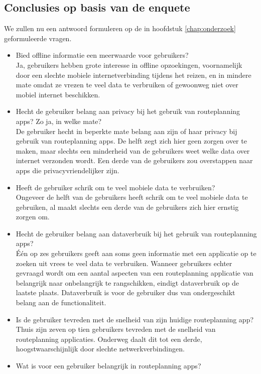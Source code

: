 \subsection{Conclusies op basis van de enquete}
We zullen nu een antwoord formuleren op de in hoofdstuk \ref{chap:onderzoek} geformuleerde vragen.
\begin{itemize}
	\item Bied offline informatie een meerwaarde voor gebruikers?\\
	Ja, gebruikers hebben grote interesse in offline opzoekingen, voornamelijk door een slechte mobiele internetverbinding tijdens het reizen, en in mindere mate omdat ze vrezen te veel data te verbruiken of gewoonweg niet over mobiel internet beschikken.
	\item Hecht de gebruiker belang aan privacy bij het gebruik van routeplanning apps? Zo ja, in welke mate?\\
	De gebruiker hecht in beperkte mate belang aan zijn of haar privacy bij gebruik van routeplanning apps. De helft zegt zich hier geen zorgen over te maken, maar slechts een minderheid van de gebruikers weet welke data over internet verzonden wordt. Een derde van de gebruikers zou overstappen naar apps die privacyvriendelijker zijn.
	\item Heeft de gebruiker schrik om te veel mobiele data te verbruiken?\\
	Ongeveer de helft van de gebruikers heeft schrik om te veel mobiele data te gebruiken, al maakt slechts een derde van de gebruikers zich hier ernstig zorgen om.
	\item Hecht de gebruiker belang aan dataverbruik bij het gebruik van routeplanning apps?\\
	Één op zes gebruikers geeft aan soms geen informatie met een applicatie op te zoeken uit vrees te veel data te verbruiken. Wanneer gebruikers echter gevraagd wordt om een aantal aspecten van een routeplanning applicatie van belangrijk naar onbelangrijk te rangschikken, eindigt dataverbruik op de laatste plaats. Dataverbruik is voor de gebruiker dus van ondergeschikt belang aan de functionaliteit.
	\item Is de gebruiker tevreden met de snelheid van zijn huidige routeplanning app?\\
	Thuis zijn zeven op tien gebruikers tevreden met de snelheid van routeplanning applicaties. Onderweg daalt dit tot een derde, hoogstwaarschijnlijk door slechte netwerkverbindingen.
	\item Wat is voor een gebruiker belangrijk in routeplanning apps?\\

\end{itemize}
